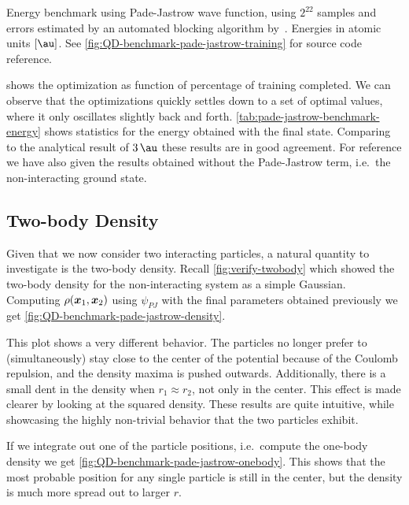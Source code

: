 \documentclass[Thesis.tex]{subfiles}
\begin{document}
\begin{table}[h]
  \centering
  \caption[Energy estimates of Pade-Jastrow wave function]{Energy benchmark using Pade-Jastrow wave function, using $2^{22}$
    samples and errors estimated by an automated blocking algorithm
    by~\textcite{Jonsson-2018}. Energies in atomic units $[\si{\au}]$. See \cref{fig:QD-benchmark-pade-jastrow-training}
    for source code reference.}
  
  \label{tab:pade-jastrow-benchmark-energy}
\end{table}

 shows the optimization as function
of percentage of training completed. We can observe that the optimizations
quickly settles down to a set of optimal values, where it only oscillates
slightly back and forth. \cref{tab:pade-jastrow-benchmark-energy} shows
statistics for the energy obtained with the final state. Comparing to the
analytical result of $\SI{3}{\au}$ these results are in good agreement. For
reference we have also given the results obtained without the Pade-Jastrow term,
i.e.\ the non-interacting ground state.

\subsection{Two-body Density}

Given that we now consider two interacting particles, a natural quantity to
investigate is the two-body density. Recall \cref{fig:verify-twobody} which
showed the two-body density for the non-interacting system as a simple Gaussian.
Computing $\rho(\bm{x}_1, \bm{x}_2)$ using $\psi_{PJ}$ with the final parameters
obtained previously we get \cref{fig:QD-benchmark-pade-jastrow-density}.

This plot shows a very different behavior. The particles no longer prefer to
(simultaneously) stay close to the center of the potential because of the Coulomb repulsion, and
the density maxima is pushed outwards. Additionally, there is a small dent in
the density when $r_1\approx r_2$, not only in the center. This effect is made
clearer by looking at the squared density. These results are quite intuitive,
while showcasing the highly non-trivial behavior that the two particles exhibit.

If we integrate out one of the particle positions, i.e.\ compute the one-body
density we get \cref{fig:QD-benchmark-pade-jastrow-onebody}. This shows that the
most probable position for any single particle is still in the center, but the
density is much more spread out to larger $r$.
\end{document}

